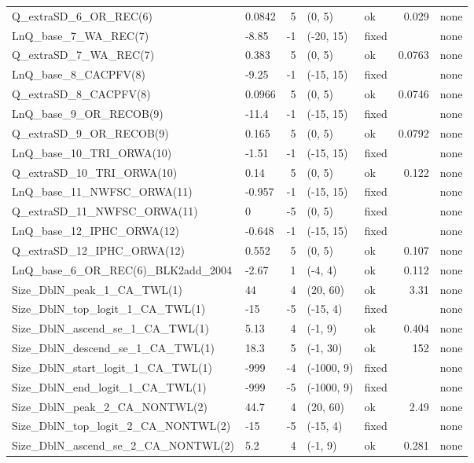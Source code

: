 \documentclass[
  english,
]{article}
\begin{document}
\begin{landscape}
\begin{longtable}{llrllrl}
Q\_extraSD\_6\_OR\_REC(6) & 0.0842 & 5 & (0, 5) & ok & 0.029 & none \\ 
LnQ\_base\_7\_WA\_REC(7) & -8.85 & -1 & (-20, 15) & fixed &  & none \\ 
Q\_extraSD\_7\_WA\_REC(7) & 0.383 & 5 & (0, 5) & ok & 0.0763 & none \\ 
LnQ\_base\_8\_CACPFV(8) & -9.25 & -1 & (-15, 15) & fixed &  & none \\ 
Q\_extraSD\_8\_CACPFV(8) & 0.0966 & 5 & (0, 5) & ok & 0.0746 & none \\ 
LnQ\_base\_9\_OR\_RECOB(9) & -11.4 & -1 & (-15, 15) & fixed &  & none \\ 
Q\_extraSD\_9\_OR\_RECOB(9) & 0.165 & 5 & (0, 5) & ok & 0.0792 & none \\ 
LnQ\_base\_10\_TRI\_ORWA(10) & -1.51 & -1 & (-15, 15) & fixed &  & none \\ 
Q\_extraSD\_10\_TRI\_ORWA(10) & 0.14 & 5 & (0, 5) & ok & 0.122 & none \\ 
LnQ\_base\_11\_NWFSC\_ORWA(11) & -0.957 & -1 & (-15, 15) & fixed &  & none \\ 
Q\_extraSD\_11\_NWFSC\_ORWA(11) & 0 & -5 & (0, 5) & fixed &  & none \\ 
LnQ\_base\_12\_IPHC\_ORWA(12) & -0.648 & -1 & (-15, 15) & fixed &  & none \\ 
Q\_extraSD\_12\_IPHC\_ORWA(12) & 0.552 & 5 & (0, 5) & ok & 0.107 & none \\ 
LnQ\_base\_6\_OR\_REC(6)\_BLK2add\_2004 & -2.67 & 1 & (-4, 4) & ok & 0.112 & none \\ 
Size\_DblN\_peak\_1\_CA\_TWL(1) & 44 & 4 & (20, 60) & ok & 3.31 & none \\ 
Size\_DblN\_top\_logit\_1\_CA\_TWL(1) & -15 & -5 & (-15, 4) & fixed &  & none \\ 
Size\_DblN\_ascend\_se\_1\_CA\_TWL(1) & 5.13 & 4 & (-1, 9) & ok & 0.404 & none \\ 
Size\_DblN\_descend\_se\_1\_CA\_TWL(1) & 18.3 & 5 & (-1, 30) & ok & 152 & none \\ 
Size\_DblN\_start\_logit\_1\_CA\_TWL(1) & -999 & -4 & (-1000, 9) & fixed &  & none \\ 
Size\_DblN\_end\_logit\_1\_CA\_TWL(1) & -999 & -5 & (-1000, 9) & fixed &  & none \\ 
Size\_DblN\_peak\_2\_CA\_NONTWL(2) & 44.7 & 4 & (20, 60) & ok & 2.49 & none \\ 
Size\_DblN\_top\_logit\_2\_CA\_NONTWL(2) & -15 & -5 & (-15, 4) & fixed &  & none \\ 
Size\_DblN\_ascend\_se\_2\_CA\_NONTWL(2) & 5.2 & 4 & (-1, 9) & ok & 0.281 & none \\ 

\end{longtable}
\end{landscape}
\end{document}
